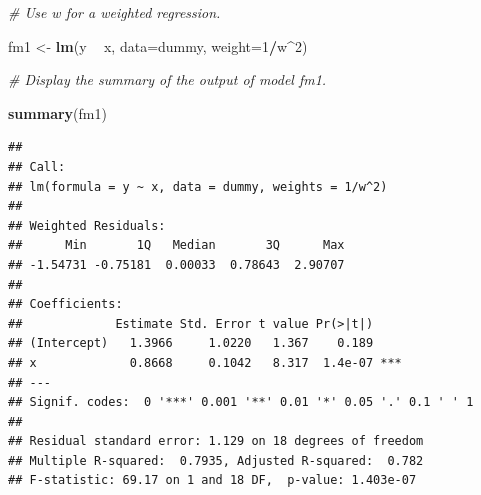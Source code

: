 \documentclass[]{book}
\newenvironment{Shaded}{\begin{snugshade}}{\end{snugshade}}
\newcommand{\CommentTok}[1]{\textcolor[rgb]{0.56,0.35,0.01}{\textit{#1}}}
\newcommand{\DataTypeTok}[1]{\textcolor[rgb]{0.13,0.29,0.53}{#1}}
\newcommand{\DecValTok}[1]{\textcolor[rgb]{0.00,0.00,0.81}{#1}}
\newcommand{\KeywordTok}[1]{\textcolor[rgb]{0.13,0.29,0.53}{\textbf{#1}}}
\newcommand{\NormalTok}[1]{#1}
\newcommand{\OperatorTok}[1]{\textcolor[rgb]{0.81,0.36,0.00}{\textbf{#1}}}
\newcommand{\StringTok}[1]{\textcolor[rgb]{0.31,0.60,0.02}{#1}}
\begin{document}
\begin{Shaded}
\begin{Highlighting}[]
\CommentTok{# Use w for a weighted regression.}

\NormalTok{fm1 <-}\StringTok{ }\KeywordTok{lm}\NormalTok{(y }\OperatorTok{~}\StringTok{ }\NormalTok{x, }\DataTypeTok{data=}\NormalTok{dummy, }\DataTypeTok{weight=}\DecValTok{1}\OperatorTok{/}\NormalTok{w}\OperatorTok{^}\DecValTok{2}\NormalTok{) }

\CommentTok{# Display the summary of the output of model fm1.}

\KeywordTok{summary}\NormalTok{(fm1)}
\end{Highlighting}
\end{Shaded}

\begin{verbatim}
## 
## Call:
## lm(formula = y ~ x, data = dummy, weights = 1/w^2)
## 
## Weighted Residuals:
##      Min       1Q   Median       3Q      Max 
## -1.54731 -0.75181  0.00033  0.78643  2.90707 
## 
## Coefficients:
##             Estimate Std. Error t value Pr(>|t|)    
## (Intercept)   1.3966     1.0220   1.367    0.189    
## x             0.8668     0.1042   8.317  1.4e-07 ***
## ---
## Signif. codes:  0 '***' 0.001 '**' 0.01 '*' 0.05 '.' 0.1 ' ' 1
## 
## Residual standard error: 1.129 on 18 degrees of freedom
## Multiple R-squared:  0.7935, Adjusted R-squared:  0.782 
## F-statistic: 69.17 on 1 and 18 DF,  p-value: 1.403e-07
\end{verbatim}

\begin{Shaded}
\end{Shaded}
\end{document}
